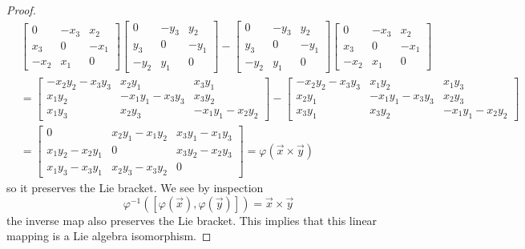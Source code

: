\begin{proof}
\begin{subequations}
\begin{align}
&\begin{bmatrix}0 & -x_{3} &
  x_{2}\\x_{3}&0&-x_{1}\\-x_{2}&x_{1}&0\end{bmatrix}
\begin{bmatrix}0 & -y_{3} &
  y_{2}\\y_{3}&0&-y_{1}\\-y_{2}&y_{1}&0\end{bmatrix}
-
\begin{bmatrix}0 & -y_{3} &
  y_{2}\\y_{3}&0&-y_{1}\\-y_{2}&y_{1}&0\end{bmatrix}
\begin{bmatrix}0 & -x_{3} &
  x_{2}\\x_{3}&0&-x_{1}\\-x_{2}&x_{1}&0\end{bmatrix}\nonumber\\
&=
\begin{bmatrix}
-x_2 y_2-x_3 y_3 & x_2 y_1 & x_3 y_1 \\
x_1 y_2 & -x_1 y_1-x_3 y_3 & x_3 y_2 \\
x_1 y_3 & x_2 y_3 & -x_1 y_1-x_2 y_2\end{bmatrix}
-\begin{bmatrix}
-x_2 y_2-x_3 y_3 & x_1 y_2 & x_1 y_3 \\
x_2 y_1 & -x_1 y_1-x_3 y_3 & x_2 y_3 \\
x_3 y_1 & x_3 y_2 & -x_1 y_1-x_2 y_2
\end{bmatrix}\\
&= \begin{bmatrix}
0 & x_2 y_1-x_1 y_2 & x_3 y_1-x_1 y_3 \\
x_1 y_2-x_2 y_1 & 0 & x_3 y_2-x_2 y_3 \\
x_1 y_3-x_3 y_1 & x_2 y_3-x_3 y_2 & 0
\end{bmatrix}=\varphi(\vec{x}\times\vec{y})
\end{align}
\end{subequations}
so it preserves the Lie bracket. We see by inspection
\begin{equation}
\varphi^{-1}\left([\varphi(\vec{x}),\varphi(\vec{y})]\right)=\vec{x}\times\vec{y}
\end{equation}
the inverse map also preserves the Lie bracket. This implies that
this linear mapping is a Lie algebra isomorphism.
\end{proof}

